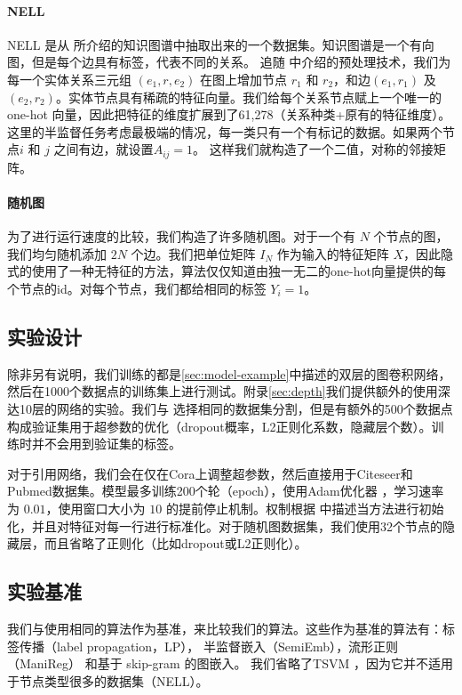 \documentclass{article} %
\begin{document}
\paragraph{NELL} NELL 是从 \citep{carlson2010toward} 所介绍的知识图谱中抽取出来的一个数据集。知识图谱是一个有向图，但是每个边具有标签，代表不同的关系。 追随 \cite{yang2016revisiting} 中介绍的预处理技术，我们为每一个实体关系三元组 $(e_1, r, e_2)$ 在图上增加节点 $r_1$ 和 $r_2$，和边$(e_1, r_1)$ 及 $(e_2, r_2)$。实体节点具有稀疏的特征向量。我们给每个关系节点赋上一个唯一的 one-hot 向量，因此把特征的维度扩展到了61,278（关系种类+原有的特征维度）。这里的半监督任务考虑最极端的情况，每一类只有一个有标记的数据。如果两个节点$i$ 和 $j$ 之间有边，就设置$A_{ij}=1$。
这样我们就构造了一个二值，对称的邻接矩阵。

\paragraph{随机图} 为了进行运行速度的比较，我们构造了许多随机图。对于一个有 $N$ 个节点的图，我们均匀随机添加 $2N$ 个边。我们把单位矩阵 $I_N$ 作为输入的特征矩阵 $X$，因此隐式的使用了一种无特征的方法，算法仅仅知道由独一无二的one-hot向量提供的每个节点的id。对每个节点，我们都给相同的标签 $Y_i = 1$。

\subsection{实验设计}
除非另有说明，我们训练的都是\ref{sec:model-example}中描述的双层的图卷积网络，然后在1000个数据点的训练集上进行测试。附录\ref{sec:depth}我们提供额外的使用深达10层的网络的实验。我们与 \cite{yang2016revisiting} 选择相同的数据集分割，但是有额外的500个数据点构成验证集用于超参数的优化（dropout概率，L2正则化系数，隐藏层个数）。训练时并不会用到验证集的标签。

对于引用网络，我们会在仅在Cora上调整超参数，然后直接用于Citeseer和Pubmed数据集。模型最多训练200个轮（epoch），使用Adam优化器 \citep{kingma2014adam}，学习速率为 $0.01$，使用窗口大小为 $10$ 的提前停止机制。权制根据 \cite{glorot2010understanding} 中描述当方法进行初始化，并且对特征对每一行进行标准化。对于随机图数据集，我们使用32个节点的隐藏层，而且省略了正则化（比如dropout或L2正则化）。

\subsection{实验基准}
我们与\cite{yang2016revisiting}使用相同的算法作为基准，来比较我们的算法。这些作为基准的算法有：标签传播（label propagation，LP）\citep{zhu2003semi}， 半监督嵌入（SemiEmb）\citep{weston2012deep}，流形正则（ManiReg）\citep{belkin2006manifold} 和基于 skip-gram 的图嵌入\citep{perozzi2014deepwalk}。
我们省略了TSVM \citep{joachims1999transductive}，因为它并不适用于节点类型很多的数据集（NELL）。
\end{document}
